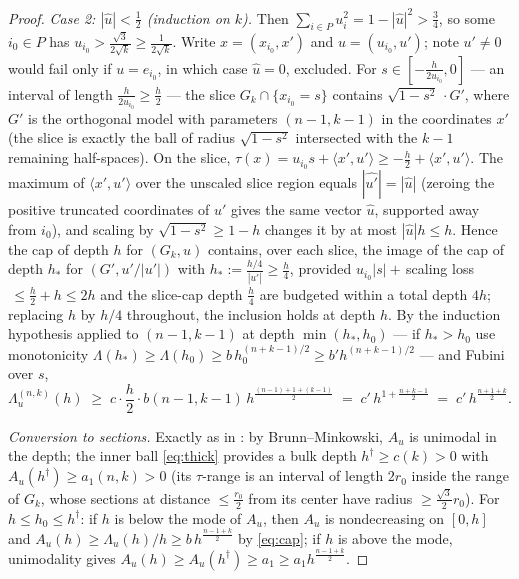 \begin{proof}
\emph{Case 2: $|\hat u|<\frac12$ (induction on $k$).}  Then
$\sum_{i\in P}u_i^2=1-|\hat u|^2>\frac34$, so some $i_0\in P$ has
$u_{i_0}>\frac{\sqrt3}{2\sqrt k}\ge\frac1{2\sqrt k}$.  Write
$x=(x_{i_0},x')$ and $u=(u_{i_0},u')$; note $u'\ne0$ would fail only if
$u=e_{i_0}$, in which case $\hat u=0$, excluded.  For
$s\in[-\frac{h}{2u_{i_0}},0]$ --- an interval of length
$\frac h{2u_{i_0}}\ge\frac h2$ --- the slice
$G_k\cap\{x_{i_0}=s\}$ contains $\sqrt{1-s^2}\,\cdot G'$, where
$G'$ is the orthogonal model with parameters $(n-1,k-1)$ in the coordinates
$x'$ {\rm(}the slice is exactly the ball of radius $\sqrt{1-s^2}$
intersected with the $k-1$ remaining half-spaces{\rm)}.  On the slice,
$\tau(x)=u_{i_0}s+\langle x',u'\rangle\ge-\frac h2+\langle x',u'\rangle$.
The maximum of $\langle x',u'\rangle$ over the unscaled slice region equals
$|\widehat{u'}|=|\hat u|$ {\rm(}zeroing the positive truncated coordinates of
$u'$ gives the same vector $\hat u$, supported away from
$i_0${\rm)}, and scaling by $\sqrt{1-s^2}\ge1-h$ changes it by at most
$|\hat u|h\le h$.  Hence the cap of depth $h$ for $(G_k,u)$ contains, over
each slice, the image of the cap of depth $h_*$ for
$(G',u'/|u'|)$ with
$h_*:=\frac{h/4}{|u'|}\ge\frac h4$, provided
$u_{i_0}|s|+\,$scaling loss$\,\le\frac h2+h\le2h$ and the slice-cap depth
$\frac h4$ are budgeted within a total depth $4h$; replacing $h$ by
$h/4$ throughout, the inclusion holds at depth $h$.  By the induction
hypothesis applied to $(n-1,k-1)$ at depth $\min(h_*,h_0)$ --- if
$h_*>h_0$ use monotonicity $\Lambda(h_*)\ge\Lambda(h_0)\ge b\,h_0^{(n+k-1)/2}
\ge b'h^{(n+k-1)/2}$ --- and Fubini over $s$,
\[
\Lambda^{(n,k)}_u(h)\;\ge\;c\cdot\frac h2\cdot
b(n-1,k-1)\,h^{\frac{(n-1)+1+(k-1)}2}
\;=\;c'\,h^{1+\frac{n+k-1}2}\;=\;c'\,h^{\frac{n+1+k}2}.
\]

\emph{Conversion to sections.}  Exactly as in \cite{companion7}: by
Brunn--Minkowski, $A_u$ is unimodal in the depth; the inner ball
\eqref{eq:thick} provides a bulk depth
$h^\dagger\ge c(k)>0$ with $A_u(h^\dagger)\ge a_1(n,k)>0$ {\rm(}its
$\tau$-range is an interval of length $2r_0$ inside the range of $G_k$,
whose sections at distance $\le\frac{r_0}2$ from its center have radius
$\ge\frac{\sqrt3}2r_0${\rm)}.  For $h\le h_0\le h^\dagger$: if $h$ is below
the mode of $A_u$, then $A_u$ is nondecreasing on $[0,h]$ and
$A_u(h)\ge\Lambda_u(h)/h\ge b\,h^{\frac{n-1+k}2}$ by \eqref{eq:cap}; if $h$
is above the mode, unimodality gives
$A_u(h)\ge A_u(h^\dagger)\ge a_1\ge a_1h^{\frac{n-1+k}2}$.
\end{proof}
